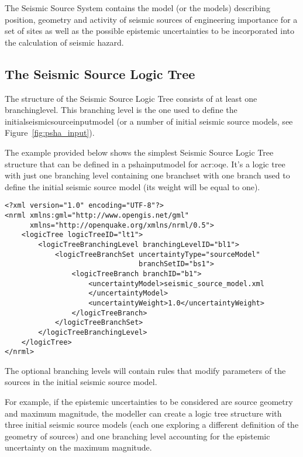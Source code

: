 The Seismic Source System contains the model (or the models) describing
position, geometry and activity of seismic sources of engineering importance
for a set of sites as well as the possible epistemic uncertainties to be
incorporated into the calculation of seismic hazard.



\subsection{The Seismic Source Logic Tree}

The structure of the Seismic Source Logic Tree consists of at least one
\gls{branchinglevel}. This branching level is the one used to define the
\gls{initialseismicsourceinputmodel} (or a number of initial seismic source
models, see Figure~\ref{fig:psha_input}).

The example provided below shows the simplest Seismic Source Logic Tree
structure that can be defined in a \gls{pshainputmodel} for \gls{acr:oqe}.
It's a logic tree with just one branching level containing one \gls{branchset}
with one branch used to define the initial seismic source model (its weight
will be equal to one).

\begin{verbatim}
<?xml version="1.0" encoding="UTF-8"?>
<nrml xmlns:gml="http://www.opengis.net/gml"
      xmlns="http://openquake.org/xmlns/nrml/0.5">
    <logicTree logicTreeID="lt1">
        <logicTreeBranchingLevel branchingLevelID="bl1">
            <logicTreeBranchSet uncertaintyType="sourceModel"
                                branchSetID="bs1">
                <logicTreeBranch branchID="b1">
                    <uncertaintyModel>seismic_source_model.xml
                    </uncertaintyModel>
                    <uncertaintyWeight>1.0</uncertaintyWeight>
                </logicTreeBranch>
            </logicTreeBranchSet>
        </logicTreeBranchingLevel>
    </logicTree>
</nrml>
\end{verbatim}

The optional branching levels will contain rules that modify parameters of the
sources in the initial seismic source model.

For example, if the epistemic uncertainties to be considered are source
geometry and maximum magnitude, the modeller can create a logic tree structure
with three initial seismic source models (each one exploring a different
definition of the geometry of sources) and one branching level accounting for
the epistemic uncertainty on the maximum magnitude.


